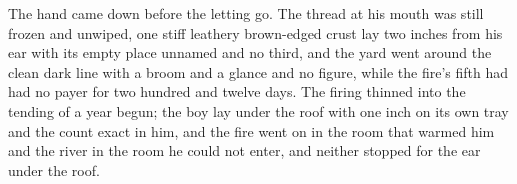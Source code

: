The hand came down before the letting go. The thread at his mouth was still frozen and unwiped, one stiff leathery brown-edged crust lay two inches from his ear with its empty place unnamed and no third, and the yard went around the clean dark line with a broom and a glance and no figure, while the fire's fifth had had no payer for two hundred and twelve days. The firing thinned into the tending of a year begun; the boy lay under the roof with one inch on its own tray and the count exact in him, and the fire went on in the room that warmed him and the river in the room he could not enter, and neither stopped for the ear under the roof.
